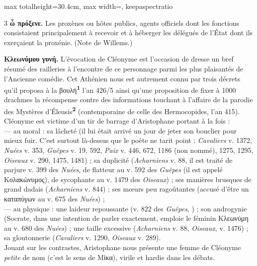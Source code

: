 \documentclass[11pt,twoside]{book}
\newcommand{\italique}[1]{\textit{#1}}
\newcommand{\grec}[1]{{\policeGr #1}}
\newcommand{\marqueur}[1]{\textsuperscript{\color{rubricRed}\textbf{#1}}}
\begin{document}
\begin{adjustbox}{max totalheight=30.4cm, max width=\textwidth, keepaspectratio}
\begin{minipage}{\textwidth}
{\begin{multicols}{3}
 \textbf{ὦ πρόξενε.} Les proxènes ou hôtes publics, agents officiels dont les fonctions consistaient principalement à recevoir et à héberger les délégués de l'État dont ils exerçaient la proxénie. (Note de Willems.)
\par\vspace{1.5pt}
 \textbf{Κλεωνύμου γυνή.} L'évocation de Cléonyme est l'occasion de dresse un bref résumé des railleries à l'encontre de ce personnage parmi les plus plaisantés de l'Ancienne comédie. Cet Athénien nous est autrement connu par trois décrets qu'il proposa à la \grec{βουλή}\marqueur{1} l'an 426/5 ainsi qu'une proposition de fixer à 1000 drachmes la récompense contre des informations touchant à l'affaire de la parodie des Mystères d'Éleusis\marqueur{2} (contemporaine de celle des Hermocopides, l'an 415). Cléonyme est victime d'un tir de barrage d'Aristophane portant à la fois :\\ — au moral : sa lâcheté (il lui était arrivé un jour de jeter son bouclier pour mieux fuir. C'est surtout là-dessus que le poète ne tarit point : \italique{Cavaliers} v. 1372, \italique{Nuées} v. 353, \italique{Guêpes} v. 19, 592, \italique{Paix} v. 446, 672, 1186 (non nommé), 1275, 1295, \italique{Oiseaux} v. 290, 1475, 1481) ; sa duplicité (\italique{Acharniens} v. 88, il est traité de parjure v. 399 des \italique{Nuées}, de flatteur au v. 592 des \italique{Guêpes} (il est appelé Κολακώνυμος), de sycophante au v. 1479 des \italique{Oiseaux}) ; ses manières brusques de grand dadais (\italique{Acharniens} v. 844) ; ses mœurs peu ragoûtantes (accusé d'être un \grec{καταπύγων} au v. 675 des \italique{Nuées}) ;\\ — au physique : une laideur repoussante (v. 822 des \italique{Guêpes}, ) ; son androgynie (Socrate, dans une intention de parler exactement, emploie le féminin \grec{Κλεωνύμη} au v. 680 des \italique{Nuées}) ; une taille excessive (\italique{Acharniens} v. 88, \italique{Oiseaux}, v. 1476) ; sa gloutonnerie (\italique{Cavaliers} v. 1290, \italique{Oiseaux} v. 289).\\ Jouant sur les contrastes, Aristophane nous présente une femme de Cléonyme \italique{petite} de nom (c'est le sens de \grec{Μίκα}), virile et hardie dans les débats.\\
\par\vspace{1.5pt}

\end{multicols}}
\end{minipage}
\end{adjustbox}
\end{document}
